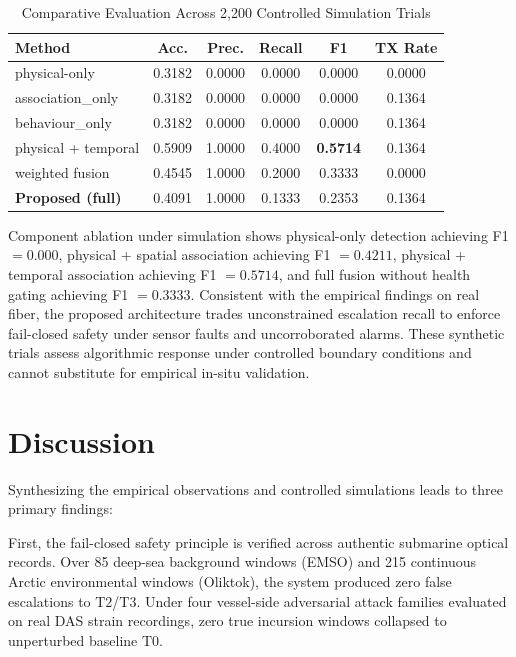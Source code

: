 \documentclass[conference]{IEEEtran}
\newcommand{\dstate}[1]{\ensuremath{\mathrm{#1}}}
\begin{document}
\begin{table}[!t]
\caption{Comparative Evaluation Across 2,200 Controlled Simulation Trials}
\label{tab:sim-baselines}
\centering
\footnotesize
\setlength{\tabcolsep}{3pt}
\begin{tabular}{@{}lccccc@{}}
\toprule
Method & Acc. & Prec. & Recall & F1 & TX Rate \\
\midrule
physical-only & 0.3182 & 0.0000 & 0.0000 & 0.0000 & 0.0000 \\
association\_only & 0.3182 & 0.0000 & 0.0000 & 0.0000 & 0.1364 \\
behaviour\_only & 0.3182 & 0.0000 & 0.0000 & 0.0000 & 0.1364 \\
physical + temporal & 0.5909 & 1.0000 & 0.4000 & \textbf{0.5714} & 0.1364 \\
weighted fusion & 0.4545 & 1.0000 & 0.2000 & 0.3333 & 0.0000 \\
\textbf{Proposed (full)} & 0.4091 & 1.0000 & 0.1333 & 0.2353 & 0.1364 \\
\bottomrule
\end{tabular}
\end{table}

Component ablation under simulation shows physical-only detection achieving F1 $= 0.000$, physical + spatial association achieving F1 $= 0.4211$, physical + temporal association achieving F1 $= 0.5714$, and full fusion without health gating achieving F1 $= 0.3333$. Consistent with the empirical findings on real fiber, the proposed architecture trades unconstrained escalation recall to enforce fail-closed safety under sensor faults and uncorroborated alarms. These synthetic trials assess algorithmic response under controlled boundary conditions and cannot substitute for empirical in-situ validation.

\section{Discussion}

Synthesizing the empirical observations and controlled simulations leads to three primary findings:

First, the fail-closed safety principle is verified across authentic submarine optical records. Over 85 deep-sea background windows (EMSO) and 215 continuous Arctic environmental windows (Oliktok), the system produced zero false escalations to \dstate{T2}/\dstate{T3}. Under four vessel-side adversarial attack families evaluated on real DAS strain recordings, zero true incursion windows collapsed to unperturbed baseline \dstate{T0}.
\end{document}
